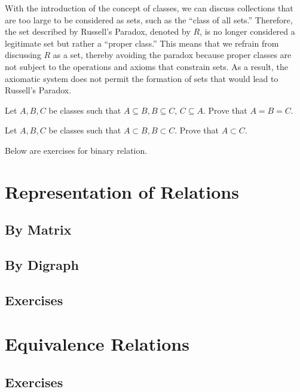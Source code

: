\begin{solution}
    With the introduction of the concept of classes, we can discuss collections 
    that are too large to be considered as sets, such as the ``class of all sets.'' 
    Therefore, the set described by Russell's Paradox, denoted by \( R \), 
    is no longer considered a legitimate set but rather a ``proper class.'' 
    This means that we refrain from discussing \( R \) as a set, thereby avoiding 
    the paradox because proper classes are not subject to the operations and 
    axioms that constrain sets. As a result, the axiomatic system does not 
    permit the formation of sets that would lead to Russell's Paradox.

\end{solution}
\begin{exercise}
    Let $A,B,C$ be classes such that $A\subseteq B,B\subseteq C$, $C\subseteq A.$ Prove that $A=B=C.$
\end{exercise}

\begin{exercise}
    Let $A,B,C$ be classes such that $A\subset B,B\subset C.$ Prove that $A\subset C.$
\end{exercise}

Below are exercises for binary relation.




\section{Representation of Relations}
	\subsection{By Matrix}
	
	\subsection{By Digraph}

\subsection{Exercises}

\section{Equivalence Relations}



\subsection{Exercises}
